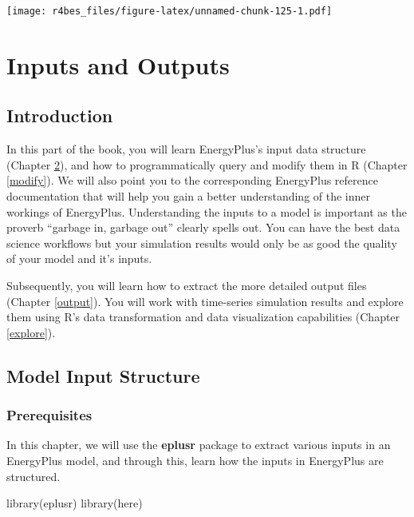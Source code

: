 \documentclass[
]{book}
\newenvironment{Shaded}{\begin{snugshade}}{\end{snugshade}}
\newcommand{\FunctionTok}[1]{\textcolor[rgb]{0.00,0.00,0.00}{#1}}
\newcommand{\NormalTok}[1]{#1}
\begin{document}
\texttt{[image: r4bes\_files/figure-latex/unnamed-chunk-125-1.pdf]}

\hypertarget{part-inputs-and-outputs}{%
\part{Inputs and Outputs}\label{part-inputs-and-outputs}}

\hypertarget{input-output}{%
\chapter{Introduction}\label{input-output}}

In this part of the book, you will learn EnergyPlus's input data structure (Chapter \ref{input}), and how to programmatically query and modify them in R (Chapter \ref{modify}). We will also point you to the corresponding EnergyPlus reference documentation that will help you gain a better understanding of the inner workings of EnergyPlus. Understanding the inputs to a model is important as the proverb ``garbage in, garbage out'' clearly spells out. You can have the best data science workflows but your simulation results would only be as good the quality of your model and it's inputs.

Subsequently, you will learn how to extract the more detailed output files (Chapter \ref{output}). You will work with time-series simulation results and explore them using R's data transformation and data visualization capabilities (Chapter \ref{explore}).

\hypertarget{input}{%
\chapter{Model Input Structure}\label{input}}

\hypertarget{prerequisites-10}{%
\section{Prerequisites}\label{prerequisites-10}}

In this chapter, we will use the \textbf{eplusr} package to extract various inputs in an EnergyPlus model, and through this, learn how the inputs in EnergyPlus are structured.

\begin{Shaded}
\begin{Highlighting}[]
\FunctionTok{library}\NormalTok{(eplusr)}
\FunctionTok{library}\NormalTok{(here)}
\end{Highlighting}
\end{Shaded}
\end{document}

